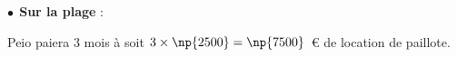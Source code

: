 
\medskip

%
%
%
%
%
%
%
%
%
%
%
%
%
%
%
$\bullet~~$\textbf{Sur la plage} :

Peio paiera 3 mois à  soit $3 \times \np{2500} = \np{7500}$~\euro{} de location de paillote.

